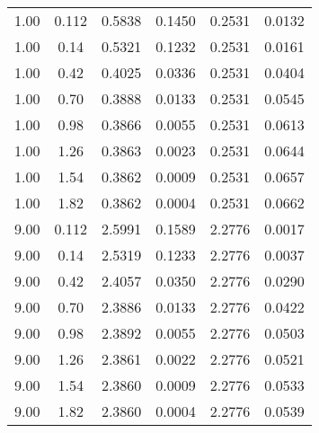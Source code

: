 \documentclass{article}[11pt]
\begin{document}
\begin{table}[h]
\begin{tabular}{cc|cccc}
1.00 & 0.112 & 0.5838 & 0.1450 & 0.2531 & 0.0132 \\
1.00 & 0.14 & 0.5321 & 0.1232 & 0.2531 & 0.0161 \\
1.00 & 0.42 & 0.4025 & 0.0336 & 0.2531 & 0.0404 \\
1.00 & 0.70 & 0.3888 & 0.0133 & 0.2531 & 0.0545 \\
1.00 & 0.98 & 0.3866 & 0.0055 & 0.2531 & 0.0613 \\
1.00 & 1.26 & 0.3863 & 0.0023 & 0.2531 & 0.0644 \\
1.00 & 1.54 & 0.3862 & 0.0009 & 0.2531 & 0.0657 \\
1.00 & 1.82 & 0.3862 & 0.0004 & 0.2531 & 0.0662 \\
9.00 & 0.112 & 2.5991 & 0.1589 & 2.2776 & 0.0017 \\
9.00 & 0.14 & 2.5319 & 0.1233 & 2.2776 & 0.0037 \\
9.00 & 0.42 & 2.4057 & 0.0350 & 2.2776 & 0.0290 \\
9.00 & 0.70 & 2.3886 & 0.0133 & 2.2776 & 0.0422 \\
9.00 & 0.98 & 2.3892 & 0.0055 & 2.2776 & 0.0503 \\
9.00 & 1.26 & 2.3861 & 0.0022 & 2.2776 & 0.0521 \\
9.00 & 1.54 & 2.3860 & 0.0009 & 2.2776 & 0.0533 \\
9.00 & 1.82 & 2.3860 & 0.0004 & 2.2776 & 0.0539 \\ \toprule
\end{tabular}
\label{tab:captab-sky130-m1}
\end{table}

\printbibliography
\end{document}
